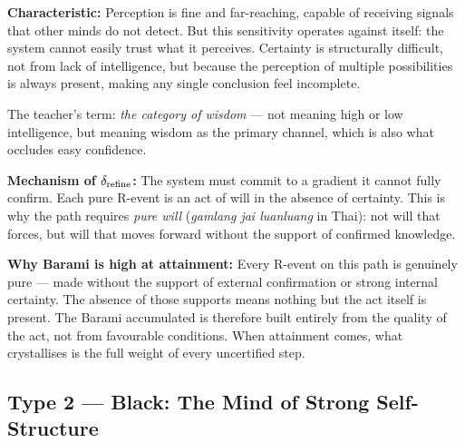 \documentclass[12pt, a4paper]{article}
\begin{document}
\begin{formalbox}[title={Type 1 (White): Navigated by Pure Will}]
\textbf{Characteristic:}
Perception is fine and far-reaching, capable of receiving signals that other
minds do not detect. But this sensitivity operates against itself: the system
cannot easily trust what it perceives. Certainty is structurally difficult,
not from lack of intelligence, but because the perception of multiple
possibilities is always present, making any single conclusion feel incomplete.

The teacher's term: \textit{the category of wisdom} --- not meaning high or low
intelligence, but meaning wisdom as the primary channel, which is also what
occludes easy confidence.

\textbf{Mechanism of $\delta_{\rm refine}$:}
The system must commit to a gradient it cannot fully confirm.
Each pure R-event is an act of will in the absence of certainty.
This is why the path requires \textit{pure will} (\textit{gamlang jai luanluang}
in Thai): not will that forces, but will that moves forward
without the support of confirmed knowledge.

\textbf{Why Barami is high at attainment:}
Every R-event on this path is genuinely pure --- made without the support
of external confirmation or strong internal certainty. The absence of those
supports means nothing but the act itself is present. The Barami accumulated
is therefore built entirely from the quality of the act, not from favourable
conditions. When attainment comes, what crystallises is the full weight
of every uncertified step.
\end{formalbox}

\subsection{Type 2 --- Black: The Mind of Strong Self-Structure}
\end{document}

